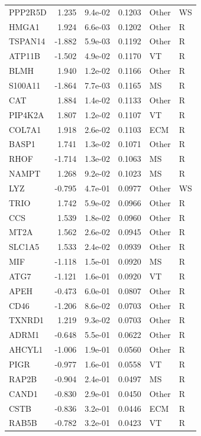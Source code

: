 \begin{table}[ht]
\begin{tabular}{lrlrll}
  PPP2R5D & 1.235 & 9.4e-02 & 0.1203 & Other & WS \\ 
  HMGA1 & 1.924 & 6.6e-03 & 0.1202 & Other & R \\ 
  TSPAN14 & -1.882 & 5.9e-03 & 0.1192 & Other & R \\ 
  ATP11B & -1.502 & 4.9e-02 & 0.1170 & VT & R \\ 
  BLMH & 1.940 & 1.2e-02 & 0.1166 & Other & R \\ 
  S100A11 & -1.864 & 7.7e-03 & 0.1165 & MS & R \\ 
  CAT & 1.884 & 1.4e-02 & 0.1133 & Other & R \\ 
  PIP4K2A & 1.807 & 1.2e-02 & 0.1107 & VT & R \\ 
  COL7A1 & 1.918 & 2.6e-02 & 0.1103 & ECM & R \\ 
  BASP1 & 1.741 & 1.3e-02 & 0.1071 & Other & R \\ 
  RHOF & -1.714 & 1.3e-02 & 0.1063 & MS & R \\ 
  NAMPT & 1.268 & 9.2e-02 & 0.1023 & MS & R \\ 
  LYZ & -0.795 & 4.7e-01 & 0.0977 & Other & WS \\ 
  TRIO & 1.742 & 5.9e-02 & 0.0966 & Other & R \\ 
  CCS & 1.539 & 1.8e-02 & 0.0960 & Other & R \\ 
  MT2A & 1.562 & 2.6e-02 & 0.0945 & Other & R \\ 
  SLC1A5 & 1.533 & 2.4e-02 & 0.0939 & Other & R \\ 
  MIF & -1.118 & 1.5e-01 & 0.0920 & MS & R \\ 
  ATG7 & -1.121 & 1.6e-01 & 0.0920 & VT & R \\ 
  APEH & -0.473 & 6.0e-01 & 0.0807 & Other & R \\ 
  CD46 & -1.206 & 8.6e-02 & 0.0703 & Other & R \\ 
  TXNRD1 & 1.219 & 9.3e-02 & 0.0703 & Other & R \\ 
  ADRM1 & -0.648 & 5.5e-01 & 0.0622 & Other & R \\ 
  AHCYL1 & -1.006 & 1.9e-01 & 0.0560 & Other & R \\ 
  PIGR & -0.977 & 1.6e-01 & 0.0558 & VT & R \\ 
  RAP2B & -0.904 & 2.4e-01 & 0.0497 & MS & R \\ 
  CAND1 & -0.830 & 2.9e-01 & 0.0450 & Other & R \\ 
  CSTB & -0.836 & 3.2e-01 & 0.0446 & ECM & R \\ 
  RAB5B & -0.782 & 3.2e-01 & 0.0423 & VT & R \\ 

\end{tabular}
\end{table}

